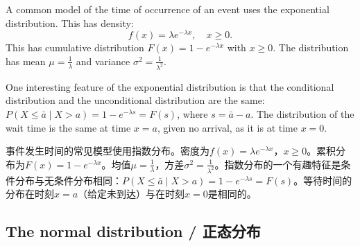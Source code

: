 \begin{original}
A common model of the time of occurrence of an event uses the exponential distribution. This has density:
\[
f(x) = \lambda e^{-\lambda x}, \quad x \geq 0.
\]
This has cumulative distribution $F(x) = 1 - e^{-\lambda x}$ with $x \geq 0$. The distribution has mean $\mu = \frac{1}{\lambda}$ and variance $\sigma^2 = \frac{1}{\lambda^2}$.

One interesting feature of the exponential distribution is that the conditional distribution and the unconditional distribution are the same: $P(X \leq \bar{a} \mid X > a) = 1 - e^{-\lambda s} = F(s)$, where $s = \bar{a} - a$. The distribution of the wait time is the same at time $x = a$, given no arrival, as it is at time $x = 0$.
\end{original}
\begin{translation}
事件发生时间的常见模型使用指数分布。密度为$f(x) = \lambda e^{-\lambda x}$，$x \geq 0$。累积分布为$F(x) = 1 - e^{-\lambda x}$。均值$\mu = \frac{1}{\lambda}$，方差$\sigma^2 = \frac{1}{\lambda^2}$。指数分布的一个有趣特征是条件分布与无条件分布相同：$P(X \leq \bar{a} \mid X > a) = 1 - e^{-\lambda s} = F(s)$。等待时间的分布在时刻$x = a$（给定未到达）与在时刻$x = 0$是相同的。
\end{translation}

\subsection{The normal distribution / 正态分布}

